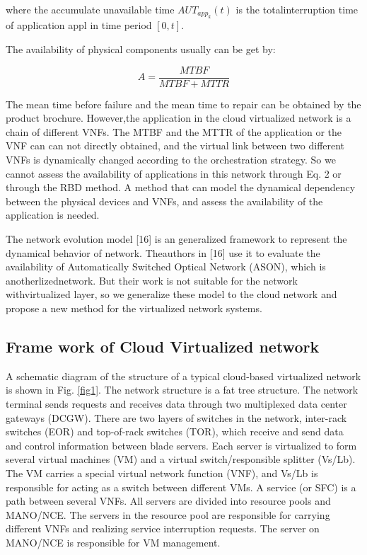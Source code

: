 \documentclass[journal]{IEEEtran}
\begin{document}
    where the accumulate unavailable time $AUT_{app_k}(t)$ is the totalinterruption time of application appl in time period $[0, t]$.

    The availability of physical components usually can be get by:

    \begin{equation}
    	A = \frac{MTBF}{MTBF + MTTR}
    \end{equation}

    The mean time before failure and the mean time to repair can be obtained by the product brochure. However,the application in the cloud virtualized network is a chain of different VNFs. The MTBF and the MTTR of the application or the VNF can can not directly obtained, and the virtual link between two different VNFs is dynamically changed according to the orchestration strategy. So we cannot assess the availability of applications in this network through Eq. 2 or through the RBD method. A method that can model the dynamical dependency between the physical devices and VNFs, and assess the availability of the application is needed. 

    The network evolution model [16] is an generalized framework to represent the dynamical behavior of network. Theauthors in [16] use it to evaluate the availability of Automatically Switched Optical Network (ASON), which is anotherlizednetwork. But their work is not suitable for the network withvirtualized layer, so we generalize these model to the cloud network and propose a new method for the virtualized network systems.

    \subsection{Frame work of Cloud Virtualized network}
    A schematic diagram of the structure of a typical cloud-based virtualized network is shown in Fig. \ref{fig1}.
    The network structure is a fat tree structure. The network terminal sends requests and receives data through two
    multiplexed data center gateways (DCGW). There are two layers of switches in the network, inter-rack switches (EOR)
    and top-of-rack switches (TOR), which receive and send data and control information between blade servers. Each
    server is virtualized to form several virtual machines (VM) and a virtual switch/responsible splitter (Vs/Lb).
    The VM carries a special virtual network function (VNF), and Vs/Lb is responsible for acting as a switch between
    different VMs. A service (or SFC) is a path between several VNFs. All servers are divided into resource pools and
    MANO/NCE. The servers in the resource pool are responsible for carrying different VNFs and realizing service
    interruption requests. The server on MANO/NCE is responsible for VM management.
\end{document}
